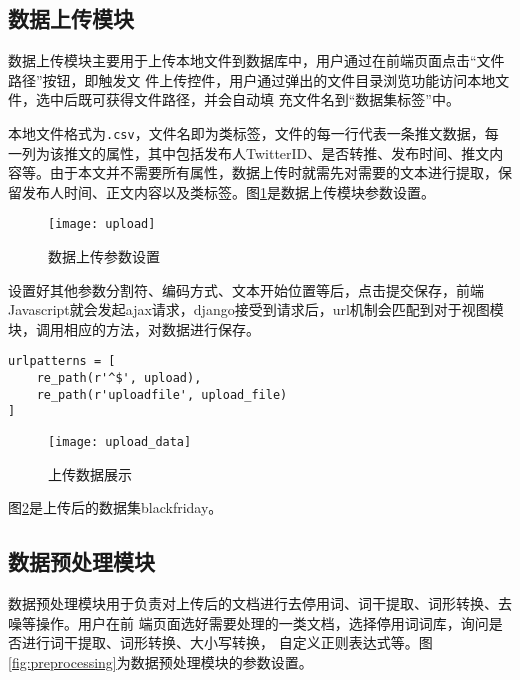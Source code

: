 
\subsection{数据上传模块}
数据上传模块主要用于上传本地文件到数据库中，用户通过在前端页面点击“文件路径”按钮，即触发文
件上传控件，用户通过弹出的文件目录浏览功能访问本地文件，选中后既可获得文件路径，并会自动填
充文件名到“数据集标签”中。

本地文件格式为\texttt{.csv}，文件名即为类标签，文件的每一行代表一条推文数据，每一列为该推文的属性，其中包括发布人TwitterID、是否转推、发布时间、推文内容等。由于本文并不需要所有属性，数据上传时就需先对需要的文本进行提取，保留发布人时间、正文内容以及类标签。图\ref{fig:upload}是数据上传模块参数设置。

\begin{figure}[htb]
  \centering
  \texttt{[image: upload]}
  \caption{数据上传参数设置}
  \label{fig:upload}
\end{figure}

设置好其他参数分割符、编码方式、文本开始位置等后，点击提交保存，前端Javascript就会发起ajax请求，django接受到请求后，url机制会匹配到对于视图模块，调用相应的方法，对数据进行保存。

\begin{verbatim}
urlpatterns = [
    re_path(r'^$', upload),
    re_path(r'uploadfile', upload_file)
]
\end{verbatim}


\begin{figure}[H]
  \centering
  \texttt{[image: upload\_data]}
  \caption{上传数据展示}
  \label{fig:upload_data}
\end{figure}

图\ref{fig:upload_data}是上传后的数据集blackfriday。

\par\subsection{数据预处理模块}
数据预处理模块用于负责对上传后的文档进行去停用词、词干提取、词形转换、去噪等操作。用户在前
端页面选好需要处理的一类文档，选择停用词词库，询问是否进行词干提取、词形转换、大小写转换，
自定义正则表达式等。图\ref{fig:preprocessing}为数据预处理模块的参数设置。

